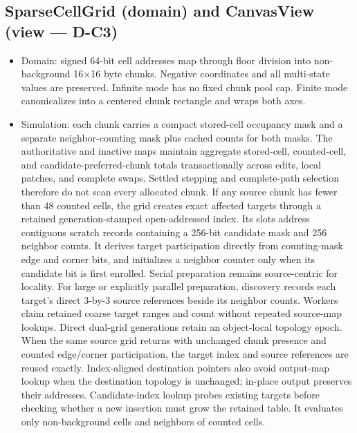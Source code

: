 \subsection{SparseCellGrid (domain) and CanvasView (view --- D-C3)}
\begin{itemize}
  \item Domain: signed 64-bit cell addresses map through floor division into
        non-background 16$\times$16 byte chunks. Negative coordinates and all
        multi-state values are preserved. Infinite mode has no fixed chunk pool
        cap. Finite mode canonicalizes into a centered chunk rectangle and
        wraps both axes.
  \item Simulation: each chunk carries a compact stored-cell occupancy mask and
        a separate neighbor-counting mask plus cached counts for both masks.
        The authoritative and inactive maps maintain aggregate stored-cell,
        counted-cell, and candidate-preferred-chunk totals transactionally
        across edits, local patches, and complete swaps. Settled stepping and
        complete-path selection therefore do not scan every allocated chunk.
        If any source
        chunk has fewer than 48 counted cells, the grid creates exact affected
        targets through a retained generation-stamped
        open-addressed index. Its slots address contiguous scratch records
        containing a 256-bit candidate mask and 256 neighbor counts. It
        derives target participation directly from counting-mask edge and
        corner bits, and initializes a neighbor counter only when its candidate
        bit is first enrolled. Serial preparation remains source-centric for
        locality. For large or explicitly parallel preparation, discovery
        records each target's direct 3-by-3 source references beside its
        neighbor counts. Workers claim retained coarse target ranges and count
        without repeated source-map lookups. Direct dual-grid generations retain
        an object-local topology epoch. When the same source grid returns with
        unchanged chunk presence and counted edge/corner participation, the
        target index and source references are reused exactly. Index-aligned
        destination pointers also avoid output-map lookup when the destination
        topology is unchanged; in-place output preserves their addresses.
        Candidate-index lookup probes existing
        targets before checking whether a new insertion must grow the retained
        table. It evaluates
        only non-background cells and neighbors of counted cells.

\end{itemize}
